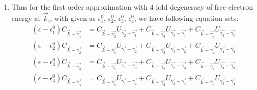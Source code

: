 \documentclass[notitlepage]{revtex4-1}
\begin{document}
\begin{CJK}{UTF8}{bsmi}
\begin{enumerate}
	\begin{enumerate}[label=(\alph*)]
		\item Thus for the first order approximation with 4 fold degeneracy of free electron energy at $\vec{k}_w$ with given as $\epsilon^{0}_{1}$, $\epsilon^{0}_{2}$, $\epsilon^{0}_{3}$, $\epsilon^{0}_{4}$, we have following equation sets:
		\begin{align*}
			\left( \epsilon - \epsilon^{0}_{1} \right) C_{\vec{k} - \vec{\gamma_{1}}}  &= C_{\vec{k}-\vec{\gamma_{2}}} U_{\vec{\gamma_{2}}-\vec{\gamma_{1}}} 
			                                                                            + C_{\vec{k}-\vec{\gamma_{3}}} U_{\vec{\gamma_{3}}-\vec{\gamma_{1}}} 
			                                                                            + C_{\vec{k}-\vec{\gamma_{4}}} U_{\vec{\gamma_{4}}-\vec{\gamma_{1}}} \\
			\left( \epsilon - \epsilon^{0}_{2} \right) C_{\vec{k} - \vec{\gamma_{2}}}  &= C_{\vec{k}-\vec{\gamma_{1}}} U_{\vec{\gamma_{1}}-\vec{\gamma_{2}}} 
																					    + C_{\vec{k}-\vec{\gamma_{3}}} U_{\vec{\gamma_{3}}-\vec{\gamma_{2}}} 
																					    + C_{\vec{k}-\vec{\gamma_{4}}} U_{\vec{\gamma_{4}}-\vec{\gamma_{2}}} \\
			\left( \epsilon - \epsilon^{0}_{3} \right) C_{\vec{k} - \vec{\gamma_{3}}}  &= C_{\vec{k}-\vec{\gamma_{1}}} U_{\vec{\gamma_{1}}-\vec{\gamma_{3}}} 
																						+ C_{\vec{k}-\vec{\gamma_{2}}} U_{\vec{\gamma_{2}}-\vec{\gamma_{3}}} 
																						+ C_{\vec{k}-\vec{\gamma_{4}}} U_{\vec{\gamma_{4}}-\vec{\gamma_{3}}} \\
			\left( \epsilon - \epsilon^{0}_{4} \right) C_{\vec{k} - \vec{\gamma_{4}}}  &= C_{\vec{k}-\vec{\gamma_{1}}} U_{\vec{\gamma_{1}}-\vec{\gamma_{4}}} 
																						+ C_{\vec{k}-\vec{\gamma_{2}}} U_{\vec{\gamma_{2}}-\vec{\gamma_{4}}} 
																						+ C_{\vec{k}-\vec{\gamma_{3}}} U_{\vec{\gamma_{3}}-\vec{\gamma_{4}}} \\
		\end{align*}  
		

\end{enumerate}
\end{enumerate}
\end{CJK}
\end{document}
